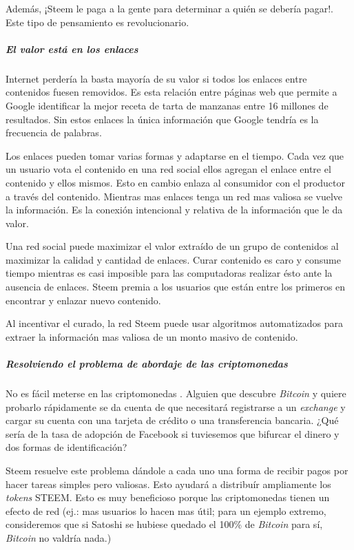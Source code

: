 \documentclass[a4paper,titlepage,final]{article}
\begin{document}
Además, ¡Steem le paga a la gente para determinar a quién se debería pagar!. Este tipo de pensamiento es revolucionario.

\subparagraph{El valor está en los enlaces}

Internet perdería la basta mayoría de su valor si todos los enlaces entre contenidos fuesen removidos. Es esta relación entre páginas web que permite a Google identificar la mejor receta de tarta de manzanas entre 16 millones de resultados. Sin estos enlaces la única información que Google tendría es la frecuencia de palabras.

Los enlaces pueden tomar varias formas y adaptarse en el tiempo. Cada vez que un usuario vota el contenido en una red social ellos agregan el enlace entre el contenido y ellos mismos. Esto en cambio enlaza al consumidor con el productor a través del contenido. Mientras mas enlaces tenga un red mas valiosa se vuelve la información. Es la conexión intencional y relativa de la información que le da valor.

Una red social puede maximizar el valor extraído de un grupo de contenidos al maximizar la calidad y cantidad de enlaces. Curar contenido es caro y consume tiempo mientras es casi imposible para las computadoras realizar ésto ante la ausencia de enlaces. Steem premia a los usuarios que están entre los primeros en encontrar y enlazar nuevo contenido.

Al incentivar el curado, la red Steem puede usar algoritmos automatizados para extraer la información mas valiosa de un monto masivo de contenido.

\subparagraph{Resolviendo el problema de abordaje de las criptomonedas}

No es fácil meterse en las criptomonedas \cite{24}. Alguien que descubre \textit{Bitcoin} y quiere probarlo rápidamente se da cuenta de que necesitará registrarse a un \textit{exchange} y cargar su cuenta con una tarjeta de crédito o una transferencia bancaria. ¿Qué sería de la tasa de adopción de Facebook si tuviesemos que bifurcar el dinero y dos formas de identificación?

Steem resuelve este problema dándole a cada uno una forma de recibir pagos por hacer tareas simples pero valiosas. Esto ayudará a distribuír ampliamente los \textit{tokens} STEEM. Esto es muy beneficioso porque las criptomonedas tienen un efecto de red (ej.: mas usuarios lo hacen mas útil; para un ejemplo extremo, consideremos que si Satoshi se hubiese quedado el 100\% de \textit{Bitcoin} para sí, \textit{Bitcoin} no valdría nada.)
\end{document}
